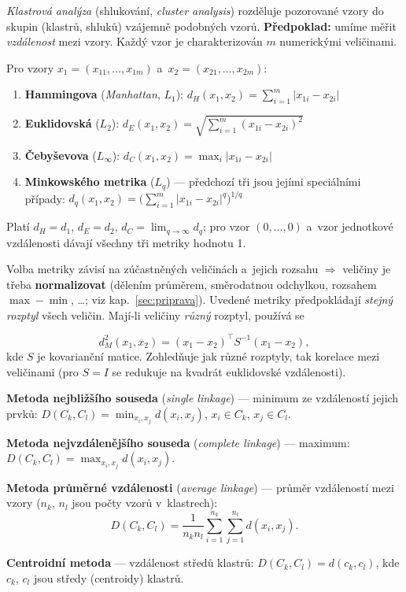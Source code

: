 \documentclass[11pt,a4paper]{article}
\theoremstyle{definition}
\begin{document}
\emph{Klastrová analýza} (shlukování, \emph{cluster analysis}) rozděluje pozorované vzory do
skupin (klastrů, shluků) vzájemně podobných vzorů. \textbf{Předpoklad:} umíme měřit
\emph{vzdálenost} mezi vzory. Každý vzor je charakterizován $m$ numerickými veličinami.

\begin{defbox}
Pro vzory $x_1=(x_{11},\dots,x_{1m})$ a~$x_2=(x_{21},\dots,x_{2m})$:
\begin{enumerate}
\item \textbf{Hammingova} (\emph{Manhattan}, $L_1$):
      $d_H(x_1,x_2)=\sum_{i=1}^{m}|x_{1i}-x_{2i}|$
\item \textbf{Euklidovská} ($L_2$):
      $d_E(x_1,x_2)=\sqrt{\sum_{i=1}^{m}(x_{1i}-x_{2i})^2}$
\item \textbf{Čebyševova} ($L_\infty$):
      $d_C(x_1,x_2)=\max_i |x_{1i}-x_{2i}|$
\item \textbf{Minkowského metrika} ($L_q$) --- předchozí tři jsou jejími speciálními případy:
      $d_q(x_1,x_2)=\Big(\sum_{i=1}^{m}|x_{1i}-x_{2i}|^{q}\Big)^{1/q}$
\end{enumerate}
Platí $d_H=d_1$, $d_E=d_2$, $d_C=\lim_{q\to\infty}d_q$; pro vzor $(0,\dots,0)$ a~vzor
jednotkové vzdálenosti dávají všechny tři metriky hodnotu 1.
\end{defbox}

Volba metriky závisí na zúčastněných veličinách a~jejich rozsahu $\Rightarrow$ veličiny je
třeba \textbf{normalizovat} (dělením průměrem, směrodatnou odchylkou, rozsahem
$\max-\min$, \dots; viz kap.~\ref{sec:priprava}). Uvedené metriky předpokládají \emph{stejný
rozptyl} všech veličin. Mají-li veličiny \emph{různý} rozptyl, používá se

\begin{defbox}
\[ d_M^2(x_1,x_2)=(x_1-x_2)^{\!\top}S^{-1}(x_1-x_2), \]
kde $S$ je kovarianční matice. Zohledňuje jak různé rozptyly, tak korelace mezi veličinami
(pro $S=I$ se redukuje na kvadrát euklidovské vzdálenosti).
\end{defbox}

\begin{defbox}
\textbf{Metoda nejbližšího souseda} (\emph{single linkage}) --- minimum ze vzdáleností jejich
prvků:
$D(C_k,C_l)=\min_{x_i,x_j} d(x_i,x_j)$, $x_i\in C_k$, $x_j\in C_l$.

\textbf{Metoda nejvzdálenějšího souseda} (\emph{complete linkage}) --- maximum:
$D(C_k,C_l)=\max_{x_i,x_j} d(x_i,x_j)$.

\textbf{Metoda průměrné vzdálenosti} (\emph{average linkage}) --- průměr vzdáleností mezi
vzory ($n_k$, $n_l$ jsou počty vzorů v~klastrech):
\[ D(C_k,C_l)=\frac{1}{n_kn_l}\sum_{i=1}^{n_k}\sum_{j=1}^{n_l} d(x_i,x_j). \]

\textbf{Centroidní metoda} --- vzdálenost středů klastrů: $D(C_k,C_l)=d(c_k,c_l)$, kde $c_k$,
$c_l$ jsou středy (centroidy) klastrů.
\end{defbox}
\end{document}
